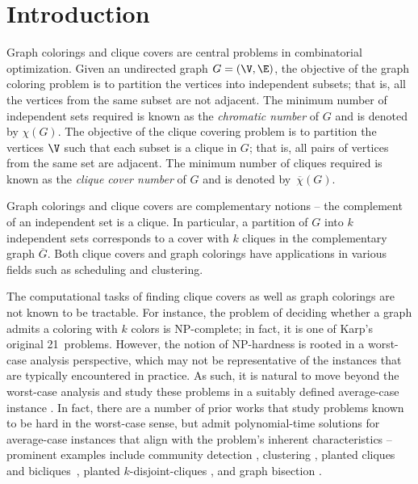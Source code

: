 
\section{Introduction}

Graph colorings and clique covers are central problems in combinatorial optimization.  Given an undirected graph $G = (\V,\E)$, the objective of the graph coloring problem is to partition the vertices into independent subsets; that is, all the vertices from the same subset are not adjacent.  The minimum number of  independent sets required is known as the {\em chromatic number} of $G$ and is denoted by $\chi(G)$.  The objective of the clique covering problem is to partition the vertices $\V$ such that each subset is a clique in $G$; that is, all pairs of vertices from the same set are adjacent.  The minimum number of cliques required is known as the {\em clique cover number} of $G$ and is denoted by~$\overline{\chi}(G)$.  

Graph colorings and clique covers are complementary notions -- the complement of an independent set is a clique.  In particular, a partition of $G$ into $k$ independent sets corresponds to a cover with $k$ cliques in the complementary graph $\overline{G}$.  Both clique covers and graph colorings have applications in various fields such as scheduling \cite{marx} and clustering.

The computational tasks of finding clique covers as well as graph colorings are not known to be tractable.  For instance, the problem of deciding whether a graph admits a coloring with $k$ colors is NP-complete; in fact, it is one of Karp's original 21~problems.   However, the notion of NP-hardness is rooted in a worst-case analysis perspective, which may not be representative of the instances that are typically encountered in practice.  As such, it is natural to move beyond the worst-case analysis \cite{rough} and study these problems in a suitably defined average-case instance \cite{Ban:16}.   
In fact, there are a number of prior works that study problems known to be hard in the worst-case sense, but admit polynomial-time solutions for average-case instances that align with the problem's inherent characteristics -- prominent examples include community detection \cite{ABH:16}, clustering \cite{ABCKVW:15,IMPV:15}, planted cliques and bicliques~\cite{AV:11,feige}, planted $k$-disjoint-cliques \cite{AV:14}, and graph bisection \cite{boppana}.


